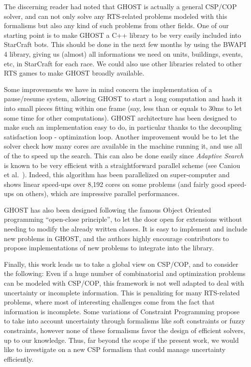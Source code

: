 \documentclass{article}
\newcommand{\csp}{\textsc{CSP}\xspace}
\newcommand{\cop}{\textsc{COP}\xspace}
\newcommand{\ghost}{\textsc{GHOST}\xspace}
\begin{document}
The  discerning reader  had noted  that \ghost  is actually  a general
\csp/\cop  solver, and  can not  only solve  any RTS-related  problems
modeled with this  formalisms but also any kind of  such problems from
other  fields. One  of our  starting  point is  to make  \ghost a  C++
library to be very easily included into StarCraft bots. This should be
done in the  next few months by  using the BWAPI 4  library, giving us
(almost) all informations we need on units, buildings, events, etc, in
StarCraft for each race.  We could also use other libraries related to
other RTS games to make \ghost broadly available.

Some  improvements we  have in  mind concern  the implementation  of a
pause/resume system, allowing  \ghost to start a  long computation and
hash it into small pieces fitting  within one frame (say, less than or
equals  to 30ms  to let  some  time for  other computations).   \ghost
architecture has been designed to  make such an implementation easy to
do,  in  particular  thanks  to the  decoupling  satisfaction  loop  -
optimization  loop. Another  improvement would  be to  let the  solver
check how many cores are available  in the machine running it, and use
all of the to speed up the  search. This can also be done easily since
{\it  Adaptive  Search}   is  known  to  be  very   efficient  with  a
straightforward      parallel      scheme     (see      Caniou      et
al.~\cite{Caniou14}). Indeed, this algorithm  has been parallelized on
super-computer and  shows linear  speed-ups over  8,192 cores  on some
problems (and fairly  good speed-ups on others),  which are impressive
parallel performances.

\ghost has  also been  designed following  the famous  Object Oriented
programming  ``open-close  principle'',  to  let  the  door  open  for
extensions without needing  to modify the already  written classes. It
is  easy to  implement and  include new  problems in  \ghost, and  the
authors highly  encourage contributors  to propose  implementations of
new problems to integrate into the library.

Finally, this work leads us to take a global view on \csp/\cop, and to
consider the  following: Even  if a huge  number of  combinatorial and
optimization problems can be modeled with \csp/\cop, this framework is
not   well   adapted   to   deal  with   uncertainty   or   incomplete
information. This  is penalizing for many  RTS-related problems, where
most of interesting challenges come  from the fact that information is
incomplete. Some variations of  Constraint Programming propose to take
into account  uncertainty through formalisms like  soft constraints or
fuzzy constraints, however  none of these formalisms  favor the design
of efficient solvers, up to our  knowledge. Thus, far beyond the scope
if  the present  work, we  would  like to  investigate on  a new  \csp
formalism that could manage uncertainty efficiently.
\end{document}
